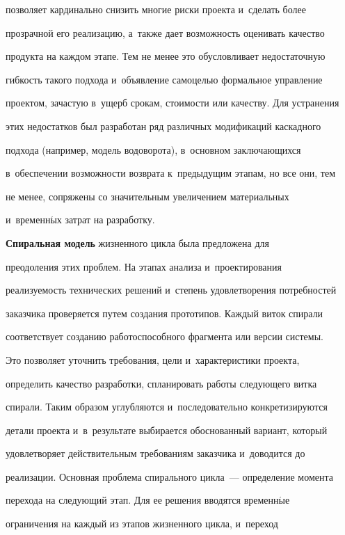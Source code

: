 позволяет кардинально снизить многие риски проекта и~сделать более 


прозрачной его реализацию, а~также дает возможность оценивать качество 


продукта на каждом этапе. Тем не менее это обусловливает недостаточную 


гибкость такого подхода и~объявление самоцелью формальное управление 


проектом, зачастую в~ущерб срокам, стоимости или качеству. Для устранения 


этих недостатков был разработан ряд различных модификаций каскадного 


подхода (например, модель водоворота), в~основном заключающихся 


в~обеспечении возможности возврата к~предыдущим этапам, но все они, тем 


не менее, сопряжены со значительным увеличением материальных 


и~временн$\acute{\mbox{ы}}$х затрат на разработку.


     


     \textbf{Спиральная модель} жизненного цикла была предложена для 


преодоления этих проблем. На этапах анализа и~проектирования 


реализуемость технических решений и~степень удовлетворения потребностей 


заказчика проверяется путем создания прототипов. Каждый виток спирали 


соответствует созданию работоспособного фрагмента или версии системы. 


Это позволяет уточнить требования, цели и~характеристики проекта, 


определить качество разработки, спланировать работы следующего витка 


спирали. Таким образом углубляются и~последовательно конкретизируются 


детали проекта и~в~результате выбирается обоснованный вариант, который 


удовлетворяет действительным требованиям заказчика и~доводится до 


реализации. Основная проблема спирального цикла~--- определение момента 


перехода на следующий этап. Для ее решения вводятся временн$\acute{\mbox{ы}}$е 


ограничения на каждый из этапов жизненного цикла, и~переход 


